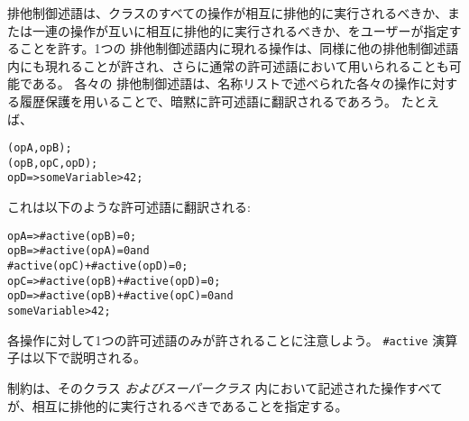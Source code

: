 \documentclass[\pformat,12pt]{jarticle}
\begin{document}
\begin{description}
 排他制御述語は、クラスのすべての操作が相互に排他的に実行されるべきか、または一連の操作が互いに相互に排他的に実行されるべきか、をユーザーが指定することを許す。1つの 排他制御述語内に現れる操作は、同様に他の排他制御述語内にも現れることが許され、さらに通常の許可述語において用いられることも可能である。
各々の 排他制御述語は、名称リストで述べられた各々の操作に対する履歴保護を用いることで、暗黙に許可述語に翻訳されるであろう。 
たとえば、 
\begin{alltt}
  (opA, opB);
  (opB, opC, opD);
   opD => someVariable > 42;
\end{alltt}
これは以下のような許可述語に翻訳される: 
\begin{alltt}
   opA => #active(opB) = 0;
   opB => #active(opA) = 0 and
          #active(opC) + #active(opD) = 0;
   opC => #active(opB) + #active(opD) = 0;
   opD => #active(opB) + #active(opC) = 0 and
          someVariable > 42;
\end{alltt}

各操作に対して1つの許可述語のみが許されることに注意しよう。
\texttt{\#active} 演算子は以下で説明される。

 制約は、そのクラス \textit{およびスーパークラス} 内において記述された操作すべてが、相互に排他的に実行されるべきであることを指定する。
\end{description}
\end{document}
